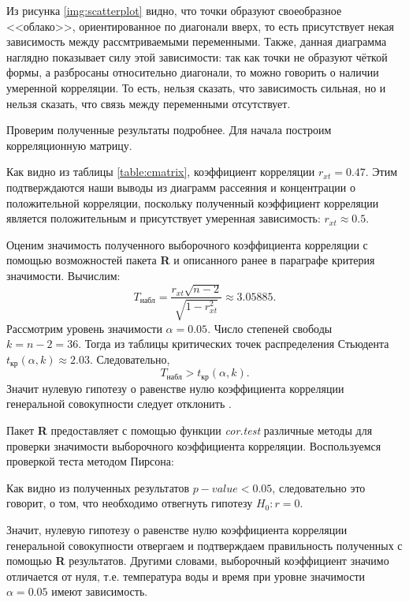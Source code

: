Из рисунка \ref{img:scatterplot} видно, что точки образуют своеобразное <<облако>>, ориентированное по диагонали вверх, то есть присутствует некая зависимость между рассмтриваемыми переменными. Также, данная диаграмма наглядно показывает силу этой зависимости: так как точки не образуют чёткой формы, а разбросаны относительно диагонали, то можно говорить о наличии умеренной корреляции. То есть, нельзя сказать, что зависимость сильная, но и нельзя сказать, что связь между переменными отсутствует.

Проверим полученные результаты подробнее. Для начала построим корреляционную матрицу.

Как видно из таблицы \ref{table:cmatrix}, коэффициент корреляции $r_{xt} = 0.47$. Этим подтверждаются наши выводы из диаграмм рассеяния и концентрации о положительной корреляции, поскольку полученный коэффициент корреляции является положительным и присутствует умеренная зависимость: $r_{xt} \approx 0.5$.

Оценим значимость полученного выборочного коэффициента корреляции с помощью возможностей пакета \textbf{R} и описанного ранее в параграфе критерия значимости. Вычислим:
\begin{equation*}
	T_{\textrm{набл}} = \frac{r_{xt} \sqrt{n - 2}}{\sqrt{1 - r_{xt}^2}} \approx 3.05885.
\end{equation*}
Рассмотрим уровень значимости $\alpha = 0.05$. Число степеней свободы $k = n - 2 = 36$. Тогда из таблицы критических точек распределения Стьюдента $t_\textrm{кр}(\alpha, k) \approx 2.03$. Следовательно,
\begin{equation*}
	T_{\textrm{набл}} > t_\textrm{кр}(\alpha, k).
\end{equation*}
Значит нулевую гипотезу о равенстве нулю коэффициента корреляции генеральной совокупности следует отклонить \cite{Eliseeva1995}.

Пакет \textbf{R} предоставляет с помощью функции \textit{cor.test} различные методы для проверки значимости выборочного коэффициента корреляции. Воспользуемся проверкой теста методом Пирсона:

Как видно из полученных результатов $p-value < 0.05$, следовательно это говорит, о том, что необходимо отвегнуть гипотезу $H_0: r = 0$.

Значит, нулевую гипотезу о равенстве нулю коэффициента корреляции генеральной совокупности отвергаем и подтверждаем правильность полученных с помощью \textbf{R} результатов. Другими словами, выборочный коэффициент значимо отличается от нуля, т.е. температура воды и время при уровне значимости $\alpha = 0.05$ имеют зависимость.

